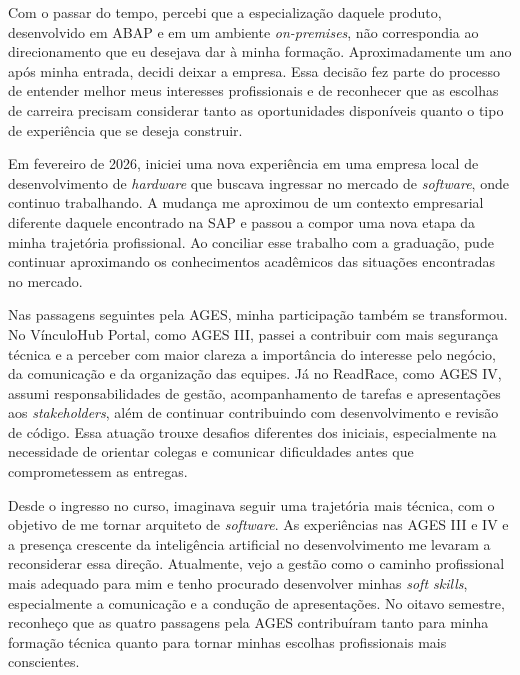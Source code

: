 Com o passar do tempo, percebi que a especialização daquele produto, desenvolvido em \ac{ABAP} e em um ambiente \textit{on-premises}, não correspondia ao direcionamento que eu desejava dar à minha formação. Aproximadamente um ano após minha entrada, decidi deixar a empresa. Essa decisão fez parte do processo de entender melhor meus interesses profissionais e de reconhecer que as escolhas de carreira precisam considerar tanto as oportunidades disponíveis quanto o tipo de experiência que se deseja construir.

Em fevereiro de 2026, iniciei uma nova experiência em uma empresa local de desenvolvimento de \textit{hardware} que buscava ingressar no mercado de \textit{software}, onde continuo trabalhando. A mudança me aproximou de um contexto empresarial diferente daquele encontrado na SAP e passou a compor uma nova etapa da minha trajetória profissional. Ao conciliar esse trabalho com a graduação, pude continuar aproximando os conhecimentos acadêmicos das situações encontradas no mercado.

Nas passagens seguintes pela \ac{AGES}, minha participação também se transformou. No VínculoHub Portal, como \ac{AGES} III, passei a contribuir com mais segurança técnica e a perceber com maior clareza a importância do interesse pelo negócio, da comunicação e da organização das equipes. Já no ReadRace, como \ac{AGES} IV, assumi responsabilidades de gestão, acompanhamento de tarefas e apresentações aos \textit{stakeholders}, além de continuar contribuindo com desenvolvimento e revisão de código. Essa atuação trouxe desafios diferentes dos iniciais, especialmente na necessidade de orientar colegas e comunicar dificuldades antes que comprometessem as entregas.

Desde o ingresso no curso, imaginava seguir uma trajetória mais técnica, com o objetivo de me tornar arquiteto de \textit{software}. As experiências nas \ac{AGES} III e IV e a presença crescente da inteligência artificial no desenvolvimento me levaram a reconsiderar essa direção. Atualmente, vejo a gestão como o caminho profissional mais adequado para mim e tenho procurado desenvolver minhas \textit{soft skills}, especialmente a comunicação e a condução de apresentações. No oitavo semestre, reconheço que as quatro passagens pela \ac{AGES} contribuíram tanto para minha formação técnica quanto para tornar minhas escolhas profissionais mais conscientes.
